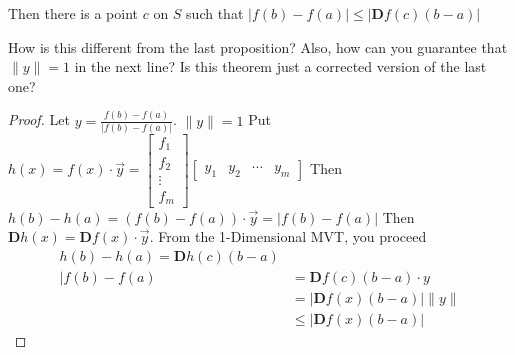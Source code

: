 \documentclass[12pt]{article}
\theoremstyle{definition}
\theoremstyle{remark}
\newenvironment{question}[2][QUESTION]{\begin{trivlist}
\item[\hskip \labelsep {\bfseries #1}\hskip \labelsep {\bfseries #2.}]}{\end{trivlist}}
\begin{document}
Then there is a point $c$ on $S$ such that $|f(b)-f(a)|\leq|\textbf{D}f(c)(b-a)|$
\begin{question}{7.2}
    How is this different from the last proposition? Also, how can you guarantee that $\|y\|=1$ in the next line? Is this theorem just a corrected version of the last one?\vspace{2in}
\end{question}
\begin{proof}
   Let $y=\frac{f(b)-f(a)}{|f(b)-f(a)|}$. $\|y\|=1$ 
   Put $h(x)=f(x)\cdot \vec{y}=\begin{bmatrix}
      f_1 \\ f_2 \\ \vdots \\ f_m 
   \end{bmatrix}
   \begin{bmatrix}
      y_1 & y_2 & \cdots & y_m 
   \end{bmatrix}$
   Then $h(b)-h(a)=(f(b)-f(a))\cdot\vec{y}=|f(b)-f(a)|$
   Then $\textbf{D}h(x)=\textbf{D}f(x)\cdot\vec{y}$. From the 1-Dimensional MVT, you proceed
   \begin{align*}
    h(b)-h(a)=\textbf{D}h(c)(b-a)\\
    |f(b)-f(a)&=\textbf{D}f(c)(b-a)\cdot y\\
    &=|\textbf{D}f(x)(b-a)|\|y\|\\
    &\leq|\textbf{D}f(x)(b-a)|\tag{Since $x\cdot y\leq|x||y|$}
   \end{align*}
\end{proof}
\end{document}
